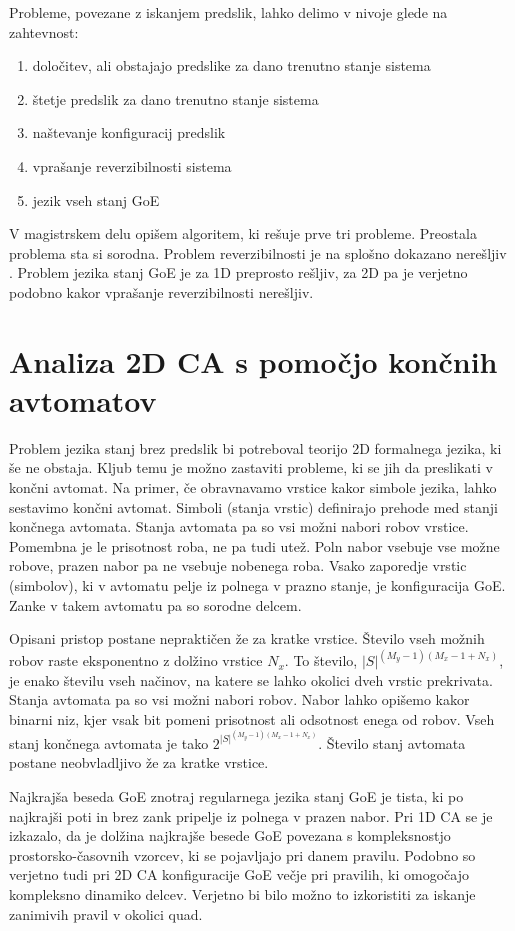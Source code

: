 \documentclass[12pt,a4paper,openany,twoside]{book}
\begin{document}
Probleme, povezane z iskanjem predslik, lahko delimo v nivoje glede na zahtevnost:
\begin{enumerate}
\item določitev, ali obstajajo predslike za dano trenutno stanje sistema
\item štetje predslik za dano trenutno stanje sistema
\item naštevanje konfiguracij predslik
\item vprašanje reverzibilnosti sistema
\item jezik vseh stanj GoE
\end{enumerate}

V magistrskem delu opišem algoritem, ki rešuje prve tri probleme.
Preostala problema sta si sorodna.
Problem reverzibilnosti je na splošno dokazano nerešljiv \cite{Kari1989}.
Problem jezika stanj GoE je za 1D preprosto rešljiv, za 2D pa je
verjetno podobno kakor vprašanje reverzibilnosti nerešljiv.

\section{Analiza 2D CA s pomočjo končnih avtomatov}

Problem jezika stanj brez predslik bi potreboval teorijo 2D formalnega jezika, ki še ne obstaja.
Kljub temu je možno zastaviti probleme, ki se jih da preslikati v končni avtomat.
Na primer, če obravnavamo vrstice kakor simbole jezika, lahko sestavimo končni avtomat.
Simboli (stanja vrstic) definirajo prehode med stanji končnega avtomata. Stanja avtomata pa
so vsi možni nabori robov vrstice. Pomembna je le prisotnost roba, ne pa tudi utež.
Poln nabor vsebuje vse možne robove, prazen nabor pa ne vsebuje nobenega roba.
Vsako zaporedje vrstic (simbolov), ki v avtomatu pelje iz polnega v prazno stanje, je konfiguracija GoE.
Zanke v takem avtomatu pa so sorodne delcem.

Opisani pristop postane nepraktičen že za kratke vrstice.
Število vseh možnih robov raste eksponentno z dolžino vrstice \(N_x\).
To število, \(|S|^{(M_y-1)(M_x-1+N_x)}\), je enako številu vseh načinov,
na katere se lahko okolici dveh vrstic prekrivata.
Stanja avtomata pa so vsi možni nabori robov.
Nabor lahko opišemo kakor binarni niz, kjer vsak bit pomeni
prisotnost ali odsotnost enega od robov.
Vseh stanj končnega avtomata je tako \(2^{ |S|^{(M_y-1)(M_x-1+N_x)} }\).
Število stanj avtomata postane neobvladljivo že za kratke vrstice.

Najkrajša beseda GoE znotraj regularnega jezika stanj GoE je tista,
ki po najkrajši poti in brez zank pripelje iz polnega v prazen nabor.
Pri 1D CA se je izkazalo, da je dolžina najkrajše besede GoE povezana s kompleksnostjo
prostorsko-časovnih vzorcev, ki se pojavljajo pri danem pravilu.
Podobno so verjetno tudi pri 2D CA konfiguracije GoE večje pri pravilih,
ki omogočajo kompleksno dinamiko delcev. Verjetno bi bilo možno to izkoristiti
za iskanje zanimivih pravil v okolici quad.
\end{document}
